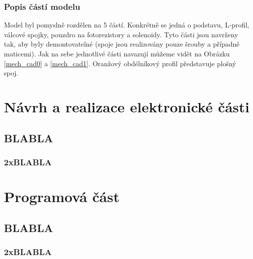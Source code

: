 \documentclass[12pt,oneside]{book} %
\begin{document}
\pagebreak

\section{Popis částí modelu}\label{mech_casti}
\qquad Model byl pomyslně rozdělen na 5 částí. Konkrétně se jedná o podstavu, L-profil, válcové spojky, pouzdro na fotorezistory a solenoidy. Tyto části jsou navrženy tak, aby byly demontovatelné (spoje jsou realizovány pouze šrouby a případně maticemi). Jak na sebe jednotlivé části navazují můžeme vidět na Obrázku \ref{mech_cad0} a \ref{mech_cad1}. Oranžový obdélníkový profil představuje plošný spoj.
\part{Návrh a realizace elektronické části}\label{elektro}

\chapter{BLABLA}\label{BLABLA}
\section{2xBLABLA}\label{2xBLABLA}

\part{Programová část}\label{program}

\chapter{BLABLA}\label{BLABLA}
\section{2xBLABLA}\label{2xBLABLA}
\end{document}
